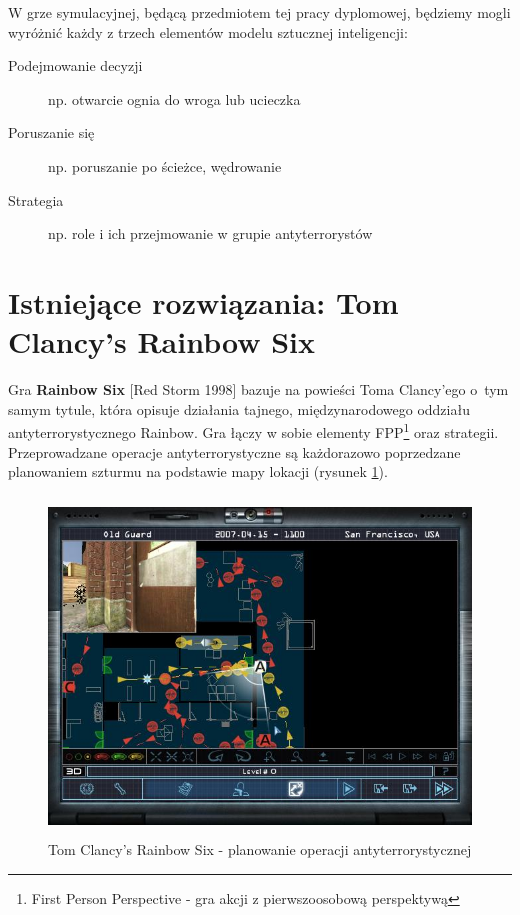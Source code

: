 W grze symulacyjnej, będącą przedmiotem tej pracy dyplomowej, będziemy mogli wyróżnić każdy z trzech elementów modelu sztucznej inteligencji:
\begin{description}
	\item[Podejmowanie decyzji] np. otwarcie ognia do wroga lub ucieczka
	\item[Poruszanie się] np. poruszanie po ścieżce, wędrowanie
	\item[Strategia] np. role i ich przejmowanie w grupie antyterrorystów
\end{description}

\section{Istniejące rozwiązania: Tom Clancy's Rainbow Six}

Gra \textbf{Rainbow Six} [Red Storm 1998] bazuje na powieści Toma Clancy'ego o~tym samym tytule, która opisuje działania tajnego, międzynarodowego oddziału antyterrorystycznego Rainbow. Gra łączy w sobie elementy FPP\footnote{First Person Perspective - gra akcji z pierwszoosobową perspektywą} oraz strategii. Przeprowadzane operacje antyterrorystyczne są każdorazowo poprzedzane planowaniem szturmu na podstawie mapy lokacji (rysunek \ref{rainbowPlan}).

\begin{figure}
\begin{center}
	\includegraphics[width=120mm,height=90mm]{images/planner}
	\caption{Tom Clancy's Rainbow Six - planowanie operacji antyterrorystycznej\label{rainbowPlan}}
\end{center}
\end{figure}


